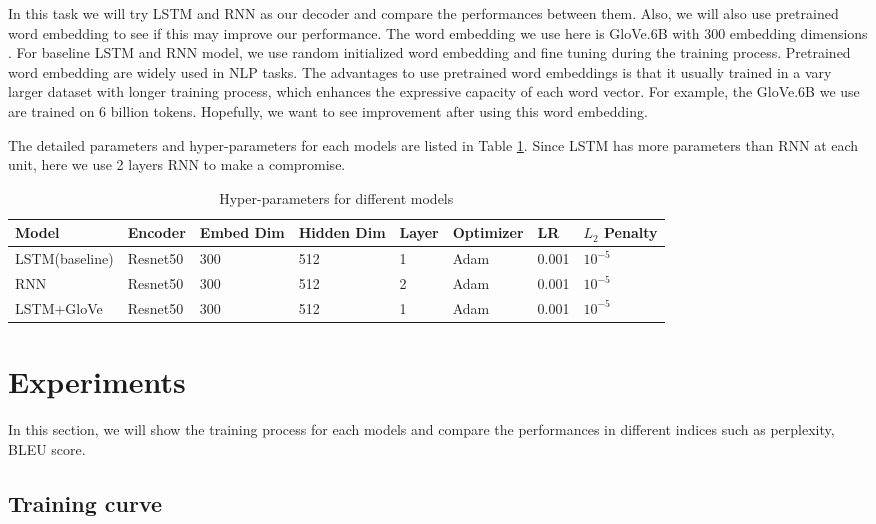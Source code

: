 \documentclass{article} %
\begin{document}
In this task we will try LSTM and RNN as our decoder and compare the performances between them. Also, we will also use pretrained word embedding to see if this may improve our performance. The word embedding we use here is GloVe.6B with 300 embedding dimensions \cite{pennington2014glove}. For baseline LSTM and RNN model, we use random initialized word embedding and fine tuning during the training process. Pretrained word embedding are widely used in NLP tasks. The advantages to use pretrained word embeddings is that it usually trained in a  vary larger dataset with longer training process, which enhances the expressive capacity of each word vector. For example, the GloVe.6B we use are trained on 6 billion tokens. Hopefully, we want to see improvement after using this word embedding.

The detailed parameters and hyper-parameters for each models are listed in Table \ref{para}. Since LSTM has more parameters than RNN at each unit, here we use 2 layers RNN to make a compromise.

\begin{table}[!htb]
    \centering
    \begin{tabular}{l|l|l|l|l|l|l|l}
        \hline
        Model & Encoder & Embed Dim & Hidden Dim & Layer &  Optimizer & LR & $L_2$ Penalty \\
        \hline
        LSTM(baseline) & Resnet50 &  300& 512 & 1 & Adam & 0.001 & $10^{-5}$ \\
        \hline
        RNN & Resnet50 & 300 & 512 & 2 & Adam & 0.001 & $10^{-5}$ \\
	    \hline
		LSTM+GloVe& Resnet50 & 300 & 512 & 1 & Adam & 0.001 & $10^{-5}$ \\
	    \hline
    \end{tabular}
    \caption{Hyper-parameters for different models}
    \label{para}
\end{table}



\section{Experiments}
In this section, we will show the training process for each models and compare the performances in different indices such as perplexity, BLEU score.

\subsection{Training curve}
\end{document}
